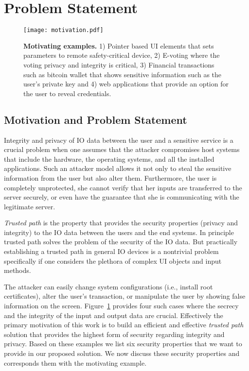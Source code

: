 \section{Problem Statement}
\label{sec:problemStatement}

\begin{figure}[t]
\centering
\texttt{[image: motivation.pdf]}
\caption{\textbf{Motivating examples.} 1) Pointer based UI elements that sets parameters to remote safety-critical device, 2) E-voting where the voting privacy and integrity is critical, 3) Financial transactions such as bitcoin wallet that shows sensitive information such as the user's private key and 4) web applications that provide an option for the user to reveal credentials.}
\label{fig:motivation}
\centering
\end{figure}






\subsection{Motivation and Problem Statement}

Integrity and privacy of IO data between the user and a sensitive service is a crucial problem when one assumes that the attacker compromises host systems that include the hardware, the operating systems, and all the installed applications. Such an attacker model allows it not only to steal the sensitive information from the user but also alter them. Furthermore, the user is completely unprotected, she cannot verify that her inputs are transferred to the server securely, or even have the guarantee that she is communicating with the legitimate server. 

\emph{Trusted path} is the property that provides the security properties (privacy and integrity) to the IO data between the users and the end systems. In principle trusted path solves the problem of the security of the IO data. But practically establishing a trusted path in general IO devices is a nontrivial problem specifically if one considers the plethora of complex UI objects and input methods. 

The attacker can easily change system configurations (i.e., install root certificates), alter the user's transaction, or manipulate the user by showing false information on the screen. Figure~\ref{fig:motivation} provides four such cases where the secrecy and the integrity of the input and output data are crucial. Effectively the primary motivation of this work is to build an efficient and effective \emph{trusted path} solution that provides the highest form of security regarding integrity and privacy.  
Based on these examples we list six security properties that we want to provide in our proposed solution. We now discuss these security properties and corresponds them with the motivating example.

